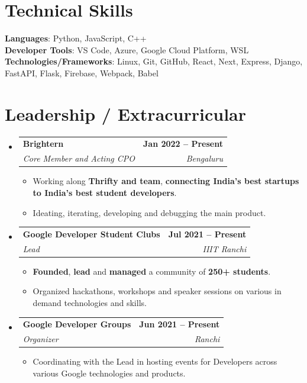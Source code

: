 \documentclass[letterpaper,11pt]{article}
\makeatletter
\newcommand{\resumeItem}[1]{
  \item\small{
    {#1 \vspace{-2pt}}
  }
}
\newcommand{\resumeSubheading}[4]{
  \vspace{-2pt}\item
    \begin{tabular*}{1.0\textwidth}[t]{l@{\extracolsep{\fill}}r}
      \textbf{#1} & \textbf{\small #2} \\
      \textit{\small#3} & \textit{\small #4} \\
    \end{tabular*}\vspace{-7pt}
}
\newcommand{\resumeSubHeadingListStart}{\begin{itemize}[leftmargin=0.0in, label={}]}
\newcommand{\resumeSubHeadingListEnd}{\end{itemize}}
\newcommand{\resumeItemListStart}{\begin{itemize}}
\newcommand{\resumeItemListEnd}{\end{itemize}\vspace{-5pt}}
\makeatother
\begin{document}
\section{Technical Skills}
 \begin{itemize}[leftmargin=0.15in, label={}]
    \small{\item{
     \textbf{Languages}{: Python, JavaScript, C++} \\
     \textbf{Developer Tools}{: VS Code, Azure, Google Cloud Platform, WSL} \\
     \textbf{Technologies/Frameworks}{: Linux, Git, GitHub, React, Next, Express, Django, FastAPI, Flask, Firebase, Webpack, Babel} \\
    }}
 \end{itemize}
 \vspace{-16pt}


\section{Leadership / Extracurricular}

    \resumeSubHeadingListStart
        \resumeSubheading{Brightern}{Jan 2022 -- Present}{Core Member and Acting CPO}{Bengaluru}
            \resumeItemListStart
                \resumeItem{Working along \textbf{Thrifty and team}, \textbf{connecting India's best startups to India's best student developers}.}
                \resumeItem{Ideating, iterating, developing and debugging the main product.}
            \resumeItemListEnd
        
        \resumeSubheading{Google Developer Student Clubs}{Jul 2021 -- Present}{Lead}{IIIT Ranchi}
            \resumeItemListStart
                \resumeItem{\textbf{Founded}, \textbf{lead} and \textbf{managed} a community of \textbf{250+ students}.}
                \resumeItem{Organized hackathons, workshops and speaker sessions on various in demand technologies and skills.}
            \resumeItemListEnd
        
        \resumeSubheading{Google Developer Groups}{Jun 2021 -- Present}{Organizer}{Ranchi}
            \resumeItemListStart
                \resumeItem{Coordinating with the Lead in hosting events for Developers across various Google technologies and products.}
            \resumeItemListEnd
        
    \resumeSubHeadingListEnd
\end{document}
